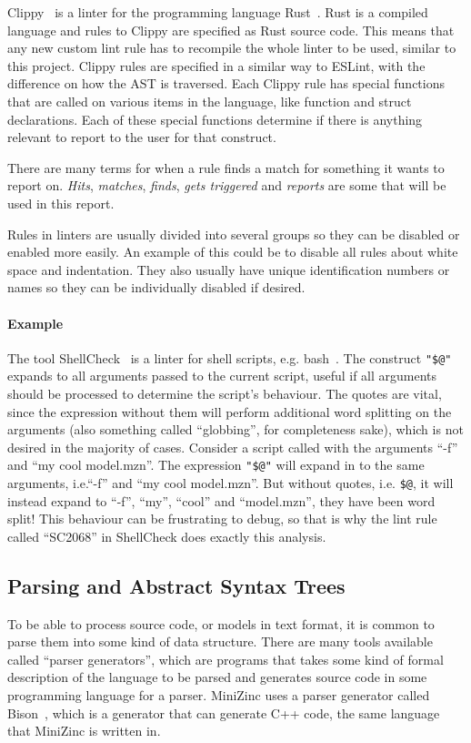 \documentclass[a4paper,12pt]{article}
\begin{document}
Clippy~\cite{Clippy} is a linter for the programming language Rust~\cite{rustlang}. Rust is
a compiled language and rules to Clippy are specified as Rust source code. This means that
any new custom lint rule has to recompile the whole linter to be used, similar to this
project. Clippy rules are specified in a similar way to ESLint, with the difference on how
the AST is traversed. Each Clippy rule has special functions that are called on various
items in the language, like function and struct declarations. Each of these special
functions determine if there is anything relevant to report to the user for that
construct.

There are many terms for when a rule finds a match for something it wants to report on.
\emph{Hits}, \emph{matches}, \emph{finds}, \emph{gets triggered} and \emph{reports} are
some that will be used in this report.

Rules in linters are usually divided into several groups so they can be disabled or
enabled more easily. An example of this could be to disable all rules about white space
and indentation. They also usually have unique identification numbers or names so they can
be individually disabled if desired.

\paragraph{Example}
The tool ShellCheck~\cite{shellcheck} is a linter for shell scripts, e.g.\@
bash~\cite{bash}. The construct \texttt{"\$@"} expands to all arguments passed to the
current script, useful if all arguments should be processed to determine the script's
behaviour. The quotes are vital, since the expression without them will perform additional
word splitting on the arguments (also something called ``globbing'', for completeness
sake), which is not desired in the majority of cases. Consider a script called with the
arguments ``-f'' and ``my cool model.mzn''. The expression \texttt{"\$@"} will expand in
to the same arguments, i.e.\@ ``-f'' and ``my cool model.mzn''. But without quotes, i.e.\@
\texttt{\$@}, it will instead expand to ``-f'', ``my'', ``cool'' and ``model.mzn'', they
have been word split! This behaviour can be frustrating to debug, so that is why the lint
rule called ``SC2068'' in ShellCheck does exactly this analysis.

\subsection{Parsing and Abstract Syntax Trees}\label{sec:parsing}
To be able to process source code, or models in text format, it is common to parse them
into some kind of data structure. There are many tools available called ``parser
generators'', which are programs that takes some kind of formal description of the
language to be parsed and generates source code in some programming language for a parser.
MiniZinc uses a parser generator called Bison~\cite{flexbison}, which is a generator that
can generate C++ code, the same language that MiniZinc is written in.
\end{document}
